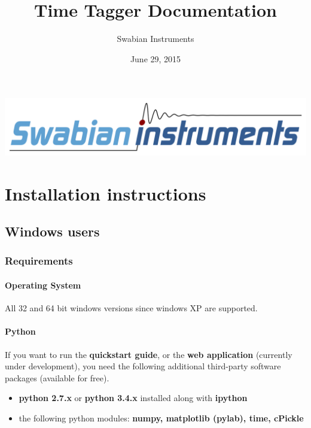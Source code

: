 \documentclass[letterpaper,10pt,english]{sphinxmanual}
\title{Time Tagger Documentation}
\date{June 29, 2015}
\author{Swabian Instruments}
\begin{document}
\maketitle
\tableofcontents
{}\label{index::doc}
{\hfill\includegraphics[width=0.900\linewidth]{logo_as_paths.png}\hfill}




\chapter{Installation instructions}
\label{sections/installation:welcome-to-time-tagger-s-documentation}\label{sections/installation::doc}\label{sections/installation:installation-instructions}

\section{Windows users}
\label{sections/installation:windows-users}

\subsection{Requirements}
\label{sections/installation:requirements}

\subsubsection{Operating System}
\label{sections/installation:operating-system}
All 32 and 64 bit windows versions since windows XP are supported.


\subsubsection{Python}
\label{sections/installation:python}
If you want to run the \textbf{quickstart guide},
or the \textbf{web application} (currently under development),
you need the following additional third-party software packages (available for free).
\begin{itemize}
\item {} 
\textbf{python 2.7.x} or \textbf{python 3.4.x} installed along with \textbf{ipython}

\item {} 
the following python modules: \textbf{numpy, matplotlib (pylab), time, cPickle}

\end{itemize}
\end{document}
